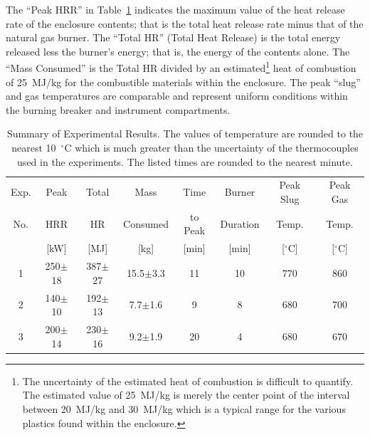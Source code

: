 \documentclass[12pt]{article}
\begin{document}
The ``Peak HRR'' in Table~\ref{matrix} indicates the maximum value of the heat release rate of the enclosure contents; that is the total heat release rate minus that of the natural gas burner. The ``Total HR'' (Total Heat Release) is the total energy released less the burner's energy; that is, the energy of the contents alone. The ``Mass Consumed'' is the Total HR divided by an estimated\footnote{The uncertainty of the estimated heat of combustion is difficult to quantify. The estimated value of 25~MJ/kg is merely the center point of the interval between 20~MJ/kg and 30~MJ/kg which is a typical range for the  various plastics found within the enclosure.} heat of combustion of 25~MJ/kg for the combustible materials within the enclosure. The peak ``slug'' and gas temperatures are comparable and represent uniform conditions within the burning breaker and instrument compartments.


\begin{table}[ht]
\begin{center}
\caption[Summary of Experimental Results]{Summary of Experimental Results. The values of temperature are rounded to the nearest 10~$^\circ$C which is much greater than the uncertainty of the thermocouples used in the experiments. The listed times are rounded to the nearest minute.}
\label{matrix}
\begin{tabular}{|c|c|c|c|c|c|c|c|}
\hline
Exp.   & Peak           & Total      & Mass            & Time            & Burner       & Peak Slug    & Peak Gas      \\
No.    & HRR            & HR         & Consumed        & to Peak         & Duration     & Temp.        & Temp.         \\
       & [kW]           & [MJ]       & [kg]            & [min]           & [min]        & [$^\circ$C]  & [$^\circ$C]   \\ \hline
1      & 250$\pm$18     & 387$\pm$27 & 15.5$\pm$3.3    & 11              & 10           & 770          & 860           \\ \hline
2      & 140$\pm$10     & 192$\pm$13 & 7.7$\pm$1.6     & 9               & 8            & 680          & 700           \\ \hline
3      & 200$\pm$14     & 230$\pm$16 & 9.2$\pm$1.9     & 20              & 4            & 680          & 670           \\ \hline
\end{tabular}
\end{center}
\end{table}
\end{document}
